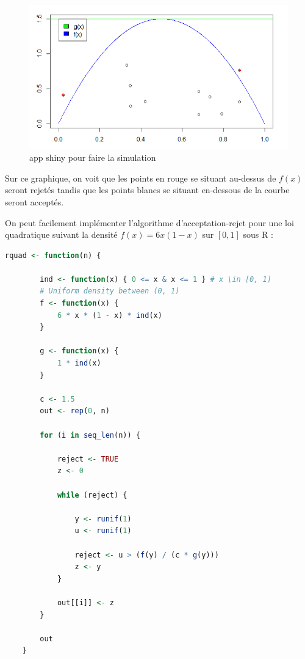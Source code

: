 \documentclass[10pt]{article} %
\begin{document}
\newpage
\begin{figure}[h!]
\centering
\includegraphics[width=\linewidth]{media/graph_acceptation_rejet.png}

\caption{app shiny pour faire la simulation}
\end{figure}

Sur ce graphique, on voit que les points en rouge se situant au-dessus de $f(x)$ seront rejetés tandis que les points blancs se situant en-dessous de la courbe seront acceptés.

On peut facilement implémenter l'algorithme d'acceptation-rejet pour une loi quadratique suivant la densité $f(x) = 6x(1 - x)$ sur $[0, 1]$ sous R :
\begin{lstlisting}[language=R]
    rquad <- function(n) {

        ind <- function(x) { 0 <= x & x <= 1 } # x \in [0, 1]
        # Uniform density between (0, 1)
        f <- function(x) {
            6 * x * (1 - x) * ind(x)
        }

        g <- function(x) {
            1 * ind(x)
        }

        c <- 1.5
        out <- rep(0, n)

        for (i in seq_len(n)) {

            reject <- TRUE
            z <- 0

            while (reject) {

                y <- runif(1)
                u <- runif(1)

                reject <- u > (f(y) / (c * g(y)))
                z <- y
            }

            out[[i]] <- z
        }

        out
    }
\end{lstlisting}
\end{document}
